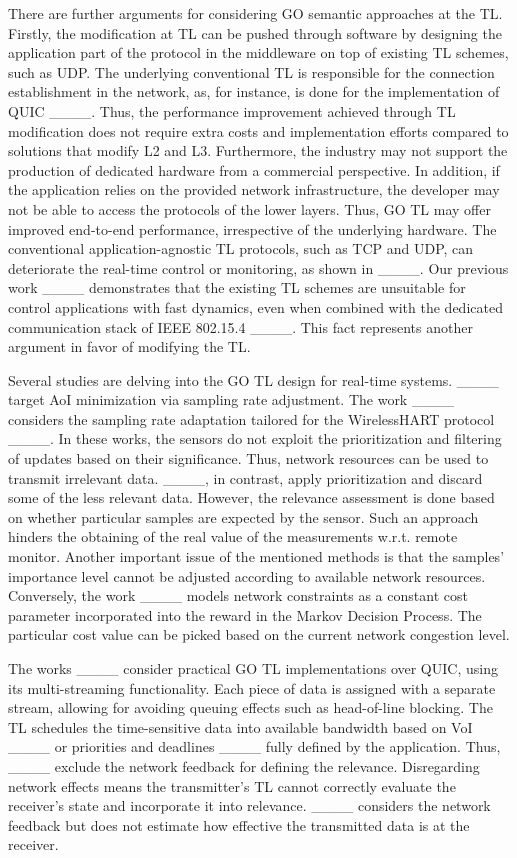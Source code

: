 There are further arguments for considering GO semantic approaches at the TL. Firstly, the modification at TL can be pushed through software by designing the application part of the protocol in the middleware on top of existing TL schemes, such as UDP. The underlying conventional TL is responsible for the connection establishment in the network, as, for instance, is done for the implementation of QUIC ____. Thus, the performance improvement achieved through TL modification does not require extra costs and implementation efforts compared to solutions that modify L2 and L3. Furthermore, the industry may not support the production of dedicated hardware from a commercial perspective. In addition, if the application relies on the provided network infrastructure, the developer may not be able to access the protocols of the lower layers. Thus, GO TL may offer improved end-to-end performance, irrespective of the underlying hardware. The conventional application-agnostic TL protocols, such as TCP and UDP, can deteriorate the real-time control or monitoring, as shown in ____. Our previous work ____ demonstrates that the existing TL schemes are unsuitable for control applications with fast dynamics, even when combined with the dedicated communication stack of IEEE 802.15.4 ____. This fact represents another argument in favor of modifying the TL.


Several studies are delving into the GO TL design for real-time systems. ____ target AoI minimization via sampling rate adjustment. The work ____ considers the sampling rate adaptation tailored for the WirelessHART protocol ____. In these works, the sensors do not exploit the prioritization and filtering of updates based on their significance. Thus, network resources can be used to transmit irrelevant data. ____, in contrast, apply prioritization and discard some of the less relevant data. However, the relevance assessment is done based on whether particular samples are expected by the sensor. Such an approach hinders the obtaining of the real value of the measurements w.r.t. remote monitor. Another important issue of the mentioned methods is that the samples' importance level cannot be adjusted according to available network resources. Conversely, the work ____ models network constraints as a constant cost parameter incorporated into the reward in the Markov Decision Process. The particular cost value can be picked based on the current network congestion level.


The works ____ consider practical GO TL implementations over QUIC, using its multi-streaming functionality. Each piece of data is assigned with a separate stream, allowing for avoiding queuing effects such as head-of-line blocking. The TL schedules the time-sensitive data into available bandwidth based on VoI ____ or priorities and deadlines ____ fully defined by the application. Thus, ____ exclude the network feedback for defining the relevance. Disregarding network effects means the transmitter's TL cannot correctly evaluate the receiver's state and incorporate it into relevance. ____ considers the network feedback but does not estimate how effective the transmitted data is at the receiver.

